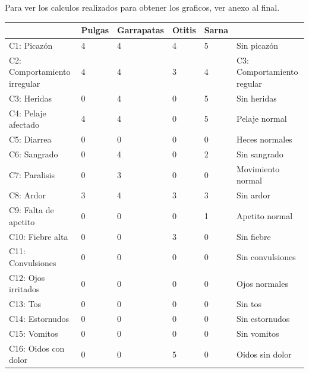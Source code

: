 \documentclass[a4paper,table,xcdraw]{article}
\begin{document}
Para ver los calculos realizados para obtener los graficos, ver anexo al final.
\begin{longtable}{|l|l|l|l|l|l|}
\hline
                         & Pulgas & Garrapatas & Otitis & Sarna &                        \\ \hline
\endhead
%
C1: Picazón                  & 4      & 4          & 4      & 5     & Sin picazón            \\ \hline
C2: Comportamiento irregular & 4      & 4          & 3      & 4     & C3: Comportamiento regular \\ \hline
C3: Heridas                  & 0      & 4          & 0      & 5     & Sin heridas            \\ \hline
C4: Pelaje afectado          & 4      & 4          & 0      & 5     & Pelaje normal          \\ \hline
C5: Diarrea                  & 0      & 0          & 0      & 0     & Heces normales         \\ \hline
C6: Sangrado                 & 0      & 4          & 0      & 2     & Sin sangrado           \\ \hline
C7: Paralisis                & 0      & 3          & 0      & 0     & Movimiento normal      \\ \hline
C8: Ardor                    & 3      & 4          & 3      & 3     & Sin ardor              \\ \hline
C9: Falta de apetito         & 0      & 0          & 0      & 1     & Apetito normal         \\ \hline
C10: Fiebre alta              & 0      & 0          & 3      & 0     & Sin fiebre             \\ \hline
C11: Convulsiones             & 0      & 0          & 0      & 0     & Sin convulsiones       \\ \hline
C12: Ojos irritados           & 0      & 0          & 0      & 0     & Ojos normales          \\ \hline
C13: Tos                      & 0      & 0          & 0      & 0     & Sin tos                \\ \hline
C14: Estornudos               & 0      & 0          & 0      & 0     & Sin estornudos         \\ \hline
C15: Vomitos                  & 0      & 0          & 0      & 0     & Sin vomitos            \\ \hline
C16: Oidos con dolor          & 0      & 0          & 5      & 0     & Oidos sin dolor        \\ \hline

\end{longtable}
\end{document}
